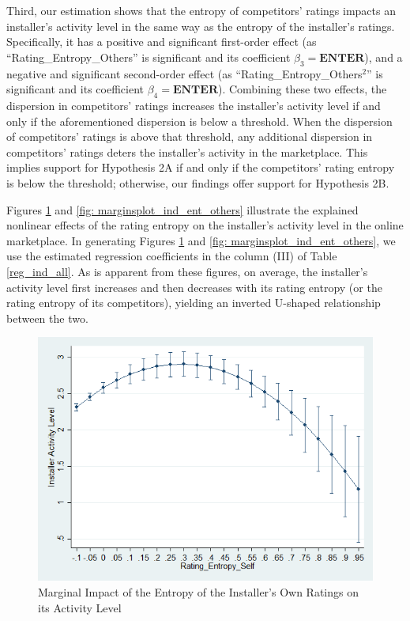 \documentclass[msom,blindrev]{informs3}
\begin{document}
Third,  our estimation shows that the entropy of competitors' ratings impacts an installer's activity level in the same way as the entropy of the installer's ratings. Specifically, it has a positive and significant first-order effect (as ``Rating\_Entropy\_Others'' is significant and its coefficient $\beta_{3} = \textbf{ENTER}$), and a negative and significant second-order effect (as ``Rating\_Entropy\_Others$^{2}$'' is significant and its coefficient $\beta_{4} = \textbf{ENTER}$). Combining these two effects,
 the dispersion in competitors' ratings increases the installer's activity level if and only if the aforementioned dispersion is below a threshold. When the dispersion of competitors' ratings is above that threshold, any additional dispersion in competitors' ratings deters the installer's activity in the marketplace. This implies support for Hypothesis 2A if and only if the competitors' rating entropy is below the threshold; otherwise, our findings offer support for Hypothesis 2B.


Figures \ref{fig: marginsplot_ind_ent_self} and  \ref{fig: marginsplot_ind_ent_others} illustrate the explained nonlinear effects of the rating entropy on the installer's activity level in the online marketplace. In generating Figures \ref{fig: marginsplot_ind_ent_self} and  \ref{fig: marginsplot_ind_ent_others}, we use the estimated regression coefficients in the column (III) of Table \ref{reg_ind_all}. As is apparent from these figures, on average, the installer's activity level first increases and then decreases with its rating entropy (or the rating entropy of its competitors), yielding an inverted U-shaped relationship between the two.

\begin{figure}
	\centering
	\includegraphics[width=0.7\linewidth]{marginsplot_entself.png}
	\caption{Marginal Impact of the Entropy of the Installer's Own Ratings on its Activity Level}
	\label{fig: marginsplot_ind_ent_self}
\end{figure}
\end{document}
